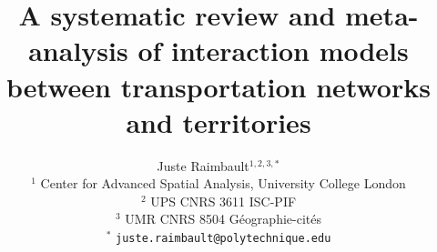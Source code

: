 \documentclass[10pt]{article}
\begin{document}
\title{A systematic review and meta-analysis of interaction models between transportation networks and territories}






\author{Juste Raimbault$^{1,2,3,\ast}$\medskip\\
$^{1}$ Center for Advanced Spatial Analysis, University College London\\
$^{2}$ UPS CNRS 3611 ISC-PIF\\
$^{3}$ UMR CNRS 8504 G{\'e}ographie-cit{\'e}s\medskip\\
$^{\ast}$ \texttt{juste.raimbault@polytechnique.edu}
}

\date{}



\maketitle


\end{document}
